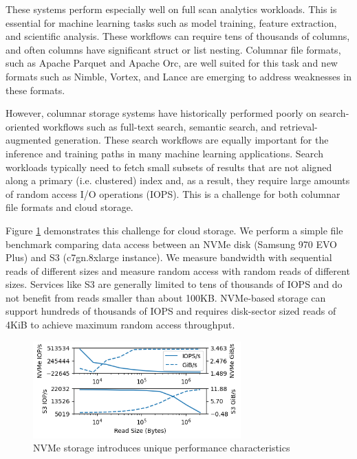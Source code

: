 \documentclass[sigconf, nonacm]{acmart}
\begin{document}
These systems perform especially well on full scan analytics workloads\cite{Datafusion}.  This is essential for machine learning tasks such as model training, feature extraction, and scientific analysis.  These workflows can require tens of thousands of columns, and often columns have significant struct or list nesting\cite{Bullion}.  Columnar file formats, such as Apache Parquet\cite{Parquet} and Apache Orc\cite{Orc}, are well suited for this task and new formats such as Nimble\cite{Nimble}, Vortex\cite{Vortex}, and Lance\cite{Lance2} are emerging to address weaknesses in these formats.

However, columnar storage systems have historically performed poorly on search-oriented workflows such as full-text search,  semantic search, and retrieval-augmented generation\cite{ColumnarEvaluation}.  These search workflows are equally important for the inference and training paths in many machine learning applications.  Search workloads typically need to fetch small subsets of results that are not aligned along a primary (i.e. clustered) index and, as a result, they require large amounts of random access I/O operations (IOPS).  This is a challenge for both columnar file formats and cloud storage.

Figure \ref{fig:disk-profile} demonstrates this challenge for cloud storage.  We perform a simple file benchmark comparing data access between an NVMe disk (Samsung 970 EVO Plus) and S3 (c7gn.8xlarge instance).  We measure bandwidth with sequential reads of different sizes and measure random access with random reads of different sizes.  Services like S3 are generally limited to tens of thousands of IOPS \cite{S3PerformanceGuidelines} and do not benefit from reads smaller than about 100KB.  NVMe-based storage can support hundreds of thousands of IOPS and requires disk-sector sized reads of 4KiB to achieve maximum random access throughput.

\begin{figure}[h]
    \centering
    \includegraphics[width=8cm]{figures/disk_perf.png}
    \caption{NVMe storage introduces unique performance characteristics}
    \label{fig:disk-profile}
\end{figure}
\end{document}
